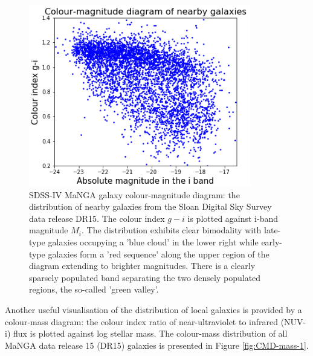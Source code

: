 \begin{figure}
    \centering
    \includegraphics[width=\columnwidth]{images/CMDs/CMD-G_i-i.png}
    \caption[SDSS-IV MaNGA galaxy colour-magnitude diagram]{SDSS-IV MaNGA galaxy colour-magnitude diagram: the distribution of nearby galaxies from the Sloan Digital Sky Survey data release DR15. The colour index $g-i$ is plotted against i-band magnitude $M_i$. The distribution exhibits clear bimodality with late-type galaxies occupying a 'blue cloud' in the lower right while early-type galaxies form a 'red sequence' along the upper region of the diagram extending to brighter magnitudes. There is a clearly sparsely populated band separating the two densely populated regions, the so-called 'green valley'.}
    \label{fig:CMD-G_i-i}
\end{figure}

Another useful visualisation of the distribution of local galaxies is provided by a colour-mass diagram: the colour index ratio of near-ultraviolet to infrared (NUV-i) flux is plotted against log stellar mass. The colour-mass distribution of all MaNGA data release 15 (DR15) galaxies is presented in Figure \ref{fig:CMD-mass-1}.

